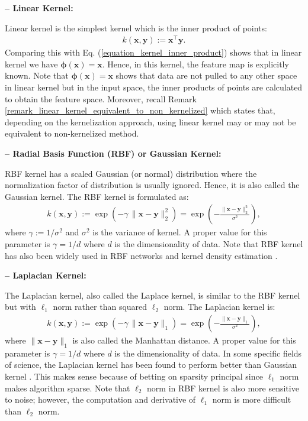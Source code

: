 \documentclass[lang=cn,10pt]{gorgeousnbook}
\numberwithin{equation}{section}%
\numberwithin{figure}{section}%
\begin{document}
\textbf{-- Linear Kernel:}

Linear kernel is the simplest kernel which is the inner product of points:
\begin{align}\label{equation_linear_kernel}
k(\boldsymbol{x}, \boldsymbol{y}) := \boldsymbol{x}^\top \boldsymbol{y}.
\end{align}
Comparing this with Eq. (\ref{equation_kernel_inner_product}) shows that in linear kernel we have $\boldsymbol{\phi}(\boldsymbol{x}) = \boldsymbol{x}$. Hence, in this kernel, the feature map is explicitly known. Note that $\boldsymbol{\phi}(\boldsymbol{x}) = \boldsymbol{x}$ shows that data are not pulled to any other space in linear kernel but in the input space, the inner products of points are calculated to obtain the feature space. 
Moreover, recall Remark \ref{remark_linear_kernel_equivalent_to_non_kernelized} which states that, depending on the kernelization approach, using linear kernel may or may not be equivalent to non-kernelized method. 

\textbf{-- Radial Basis Function (RBF) or Gaussian Kernel:}

RBF kernel has a scaled Gaussian (or normal) distribution where the normalization factor of distribution is usually ignored. Hence, it is also called the Gaussian kernel. The RBF kernel is formulated as:
\begin{align}\label{equation_RBF_kernel}
k(\boldsymbol{x}, \boldsymbol{y}) := \exp(-\gamma\, \|\boldsymbol{x} - \boldsymbol{y}\|_2^2) = \exp(-\frac{\|\boldsymbol{x} - \boldsymbol{y}\|_2^2}{\sigma^2}),
\end{align}
where $\gamma := 1/\sigma^2$ and $\sigma^2$ is the variance of kernel. 
A proper value for this parameter is $\gamma=1/d$ where $d$ is the dimensionality of data.
Note that RBF kernel has also been widely used in RBF networks \cite{orr1996introduction} and kernel density estimation \cite{scott1992multivariate}.

\textbf{-- Laplacian Kernel:}

The Laplacian kernel, also called the Laplace kernel, is similar to the RBF kernel but with $\ell_1$ norm rather than squared $\ell_2$ norm. The Laplacian kernel is: 
\begin{align}
k(\boldsymbol{x}, \boldsymbol{y}) := \exp(-\gamma\, \|\boldsymbol{x} - \boldsymbol{y}\|_1) = \exp(-\frac{\|\boldsymbol{x} - \boldsymbol{y}\|_1}{\sigma^2}),
\end{align}
where $\|\boldsymbol{x} - \boldsymbol{y}\|_1$ is also called the Manhattan distance. 
A proper value for this parameter is $\gamma=1/d$ where $d$ is the dimensionality of data.
In some specific fields of science, the Laplacian kernel has been found to perform better than Gaussian kernel \cite{rupp2015machine}. This makes sense because of betting on sparsity principal \cite{hastie2009elements} since $\ell_1$ norm makes algorithm sparse. 
Note that $\ell_2$ norm in RBF kernel is also more sensitive to noise; however, the computation and derivative of $\ell_1$ norm is more difficult than $\ell_2$ norm. 
\end{document}
